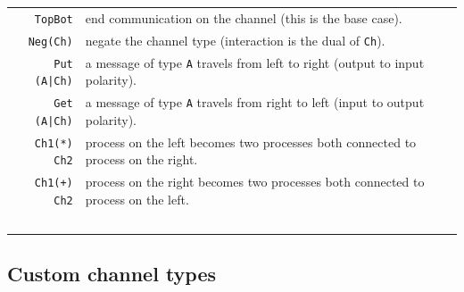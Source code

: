 \documentclass[11pt]{article}
\begin{document}
\begin{tabular}{r l}
\lstinline$TopBot$ & end communication on the channel (this is the base case). \\
\lstinline$Neg(Ch)$ & negate the channel type (interaction is the dual of \lstinline$Ch$). \\ 
\lstinline$Put (A|Ch)$ & a message of type \lstinline$A$ travels from left to right (output to input polarity). \\ 
\lstinline$Get (A|Ch)$ & a message of type \lstinline$A$ travels from right to left (input to output polarity). \\
\lstinline$Ch1(*) Ch2$ & process on the left becomes two processes both connected to process on the right. \\
\lstinline$Ch1(+) Ch2$ & process on the right becomes two processes both connected to process on the left. \\
~ & ~
\end{tabular}

\noindent 

\subsection{Custom channel types}
\label{Sec:protocols}
\end{document}
